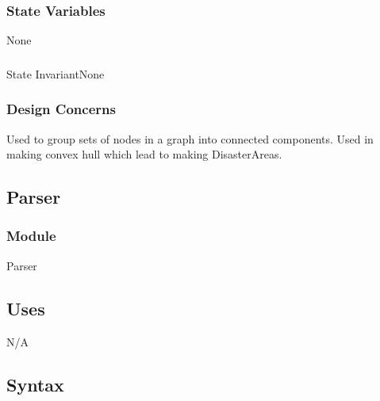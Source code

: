 \documentclass[12pt]{article}
\begin{document}
                    \subsubsection* {State Variables} None
                    \subsubsection*{} {State Invariant}None
                    \subsubsection* {Design Concerns}
                    Used to group sets of nodes in a graph into connected components. Used in making convex hull which lead to
                    making DisasterAreas. 
                \newpage
               
                 \newpage
                \subsection* {Parser}
                
                \subsubsection*{Module}
                
                Parser
                
                \subsection* {Uses}
                
                N/A
                
                \subsection* {Syntax}
\end{document}
